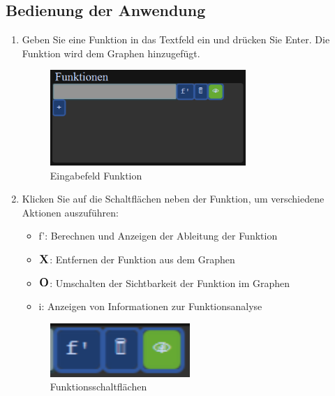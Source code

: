 \documentclass[a4paper]{article}
\begin{document}
\subsection{Bedienung der Anwendung}
\begin{enumerate}
	\item Geben Sie eine Funktion in das Textfeld ein und drücken Sie Enter. Die Funktion wird dem Graphen hinzugefügt.
	      \begin{figure}[ht]
		      \centering
		      \includegraphics[width=0.7\textwidth]{Resources/example_function.png}
		      \caption{Eingabefeld Funktion}
		      \label{fig:example_function}
	      \end{figure}
	      \newpage
	\item Klicken Sie auf die Schaltflächen neben der Funktion, um verschiedene Aktionen auszuführen:
	      \begin{itemize}
		      \item f': Berechnen und Anzeigen der Ableitung der Funktion
		      \item \(\mathrm{\large{\textbf{X}}}\): Entfernen der Funktion aus dem Graphen
		      \item \(\mathrm{\large{\textbf{O}}}\): Umschalten der Sichtbarkeit der Funktion im Graphen
		      \item i: Anzeigen von Informationen zur Funktionsanalyse
	      \end{itemize}
	      \begin{figure}[ht]
		      \centering
		      \includegraphics[width=0.5\textwidth]{Resources/example_buttons.png}
		      \caption{Funktionsschaltflächen}
		      \label{fig:example_buttons}
	      \end{figure}
\end{enumerate}
\end{document}
